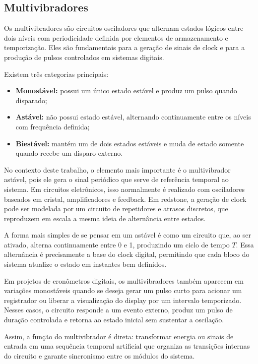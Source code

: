\subsection{Multivibradores}

Os multivibradores são circuitos osciladores que alternam estados lógicos entre dois níveis com periodicidade definida por elementos de armazenamento e temporização. Eles são fundamentais para a geração de sinais de clock e para a produção de pulsos controlados em sistemas digitais.

Existem três categorias principais:

\begin{itemize}
    \item \textbf{Monostável:} possui um único estado estável e produz um pulso quando disparado;
    \item \textbf{Astável:} não possui estado estável, alternando continuamente entre os níveis com frequência definida;
    \item \textbf{Biestável:} mantém um de dois estados estáveis e muda de estado somente quando recebe um disparo externo.
\end{itemize}

No contexto deste trabalho, o elemento mais importante é o multivibrador astável, pois ele gera o sinal periódico que serve de referência temporal ao sistema. Em circuitos eletrônicos, isso normalmente é realizado com osciladores baseados em cristal, amplificadores e feedback. Em redstone, a geração de clock pode ser modelada por um circuito de repetidores e atrasos discretos, que reproduzem em escala a mesma ideia de alternância entre estados.

A forma mais simples de se pensar em um astável é como um circuito que, ao ser ativado, alterna continuamente entre 0 e 1, produzindo um ciclo de tempo $T$. Essa alternância é precisamente a base do clock digital, permitindo que cada bloco do sistema atualize o estado em instantes bem definidos.

Em projetos de cronômetros digitais, os multivibradores também aparecem em variações monostáveis quando se deseja gerar um pulso curto para acionar um registrador ou liberar a visualização do display por um intervalo temporizado. Nesses casos, o circuito responde a um evento externo, produz um pulso de duração controlada e retorna ao estado inicial sem sustentar a oscilação.

Assim, a função do multivibrador é direta: transformar energia ou sinais de entrada em uma sequência temporal artificial que organiza as transições internas do circuito e garante sincronismo entre os módulos do sistema.
